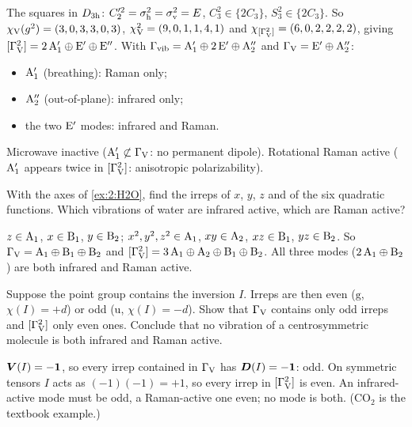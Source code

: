\begin{solution}
The squares in $D_{3\mathrm{h}}$: $C_2'^2=\sigma_{\mathrm{h}}^2=\sigma_{\mathrm{v}}^2=E$, $C_3^2\in\{2C_3\}$, $S_3^2\in\{2C_3\}$. So
$\chi_{\mathrm{V}}(g^2)=(3,0,3,3,0,3)$, $\chi_{\mathrm{V}}^2=(9,0,1,1,4,1)$ and $\chi_{[\Gamma_{\mathrm{V}}^2]}=(6,0,2,2,2,2)$,
giving $[\Gamma_{\mathrm{V}}^2]=2\,\mathrm{A}_1'\oplus\mathrm{E}'\oplus\mathrm{E}''$. With
$\Gamma_{\mathrm{vib}}=\mathrm{A}_1'\oplus2\,\mathrm{E}'\oplus\mathrm{A}_2''$ and $\Gamma_{\mathrm{V}}=\mathrm{E}'\oplus\mathrm{A}_2''$:
\begin{itemize}
\item $\mathrm{A}_1'$ (breathing): Raman only;
\item $\mathrm{A}_2''$ (out-of-plane): infrared only;
\item the two $\mathrm{E}'$ modes: infrared and Raman.
\end{itemize}
Microwave inactive ($\mathrm{A}_1'\not\subset\Gamma_{\mathrm{V}}$: no permanent dipole). Rotational Raman
active ($\mathrm{A}_1'$ appears twice in $[\Gamma_{\mathrm{V}}^2]$: anisotropic polarizability).
\end{solution}

\begin{exercise}[$\mathrm{H_2O}$]\label{ex:4:H2O}
With the axes of \cref{ex:2:H2O}, find the irreps of $x$, $y$, $z$ and of the six
quadratic functions. Which vibrations of water are infrared active, which are Raman
active?
\end{exercise}

\begin{solution}
$z\in\mathrm{A}_1$, $x\in\mathrm{B}_1$, $y\in\mathrm{B}_2$; $x^2,y^2,z^2\in\mathrm{A}_1$, $xy\in\mathrm{A}_2$,
$xz\in\mathrm{B}_1$, $yz\in\mathrm{B}_2$. So $\Gamma_{\mathrm{V}}=\mathrm{A}_1\oplus\mathrm{B}_1\oplus\mathrm{B}_2$ and
$[\Gamma_{\mathrm{V}}^2]=3\,\mathrm{A}_1\oplus\mathrm{A}_2\oplus\mathrm{B}_1\oplus\mathrm{B}_2$. All three modes
($2\,\mathrm{A}_1\oplus\mathrm{B}_2$) are both infrared and Raman active.
\end{solution}

\begin{exercise}\label{ex:4:exclusion}
Suppose the point group contains the inversion $I$. Irreps are then even ($\mathrm{g}$,
$\chi(I)=+d$) or odd ($\mathrm{u}$, $\chi(I)=-d$). Show that $\Gamma_{\mathrm{V}}$ contains only odd
irreps and $[\Gamma_{\mathrm{V}}^2]$ only even ones. Conclude that no vibration of a centrosymmetric
molecule is both infrared and Raman active.
\end{exercise}

\begin{solution}
$\bm{V}(I)=-\bm{1}$, so every irrep contained in $\Gamma_{\mathrm{V}}$ has $\bm{D}(I)=-\bm{1}$: odd. On symmetric
tensors $I$ acts as $(-1)(-1)=+1$, so every irrep in $[\Gamma_{\mathrm{V}}^2]$ is even. An infrared-active
mode must be odd, a Raman-active one even; no mode is both. ($\mathrm{CO_2}$ is the textbook
example.)
\end{solution}

